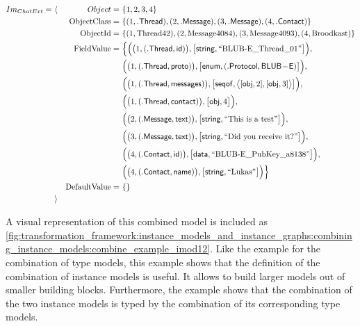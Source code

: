 \begin{align*}
Im_{ChatExt} =\ &\langle&
Object =\ &\{ 1, 2, 3, 4 \} \\&&
\mathrm{ObjectClass} =\ &\{
( 1, \mathsf{.Thread} ),
( 2, \mathsf{.Message} ),
( 3, \mathsf{.Message} ),
( 4, \mathsf{.Contact} )
\} \\&&
\mathrm{ObjectId} =\ &\{
( 1, \text{Thread42} ),
( 2, \text{Message4084} ),
( 3, \text{Message4093} ),
( 4, \text{Broodkast} )
\} \\&&
\mathrm{FieldValue} =\ &\Big\{
\Big( \big( 1, ( \mathsf{.Thread}, \mathsf{id} ) \big), \big[ \mathsf{string}, \text{``BLUB-E\_Thread\_01''} \big] \Big),\\&&&
\Big( \big( 1, ( \mathsf{.Thread}, \mathsf{proto} ) \big), \big[ \mathsf{enum}, ( \mathsf{.Protocol}, \mathsf{BLUB\!-\!E} ) \big] \Big),\\&&&
\Big( \big( 1, ( \mathsf{.Thread}, \mathsf{messages} ) \big), \big[ \mathsf{seqof}, \big\langle [ \mathsf{obj}, 2 ], [ \mathsf{obj}, 3 ] \big\rangle \big] \Big),\\&&&
\Big( \big( 1, ( \mathsf{.Thread}, \mathsf{contact} ) \big), \big[ \mathsf{obj}, 4 \big] \Big),\\&&&
\Big( \big( 2, ( \mathsf{.Message}, \mathsf{text} ) \big), \big[ \mathsf{string}, \text{``This is a test''} \big] \Big),\\&&&
\Big( \big( 3, ( \mathsf{.Message}, \mathsf{text} ) \big), \big[ \mathsf{string}, \text{``Did you receive it?''} \big] \Big),\\&&&
\Big( \big( 4, ( \mathsf{.Contact}, \mathsf{id} ) \big), \big[ \mathsf{data}, \text{``BLUB-E\_PubKey\_a8138''} \big] \Big),\\&&&
\Big( \big( 4, ( \mathsf{.Contact}, \mathsf{name} ) \big), \big[ \mathsf{string}, \text{``Lukas''} \big] \Big)
\Big\} \\&&
\mathrm{DefaultValue} =\ &\{\}
\\&\rangle
\end{align*}

A visual representation of this combined model is included as \cref{fig:transformation_framework:instance_models_and_instance_graphs:combining_instance_models:combine_example_imod12}. Like the example for the combination of type models, this example shows that the definition of the combination of instance models is useful. It allows to build larger models out of smaller building blocks. Furthermore, the example shows that the combination of the two instance models is typed by the combination of its corresponding type models.


